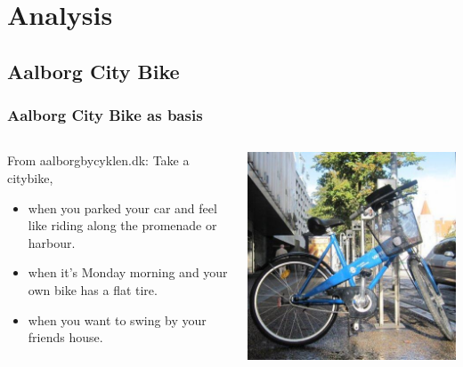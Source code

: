 \section{Analysis}

\subsection{Aalborg City Bike}

\begin{frame}
\frametitle{Aalborg City Bike as basis}
\begin{columns}
\begin{column}{.45\textwidth}
\begin{block}{From aalborgbycyklen.dk:}
Take a citybike,
\begin{itemize}
\item when you parked your car and feel like riding along the promenade or harbour.
\item when it's Monday morning and your own bike has a flat tire.
\item when you want to swing by your friends house.
\end{itemize}
\end{block}
\end{column}
\begin{column}{.45\textwidth}
\includegraphics[width=\textwidth]{graphics/acb_bike}
\end{column}
\end{columns}
\end{frame}

